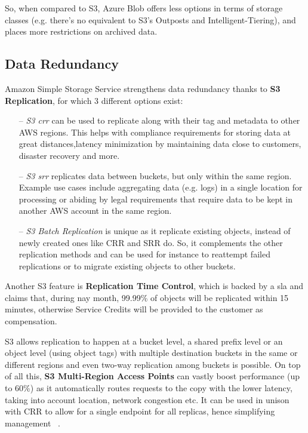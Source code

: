 So, when compared to S3, Azure Blob offers less options in terms of storage classes (e.g. there's no equivalent to S3's Outposts and Intelligent-Tiering), and places more restrictions on archived data.

\subsection{Data Redundancy}
Amazon Simple Storage Service strengthens data redundancy thanks to \textbf{S3 Replication}, for which 3 different options exist: ~\cite{s3replication}
\begin{itemize}
    \item [--] \textit{S3 \ac{crr}} can be used to replicate along with their tag and metadata to other AWS regions. This helps with compliance requirements for storing data at great distances,latency minimization by maintaining data close to customers, disaster recovery and more.

    \item [--] \textit{S3 \ac{srr}} replicates data between buckets, but only within the same region. Example use cases include aggregating data (e.g. logs) in a single location for processing or abiding by legal requirements that require data to be kept in another AWS account in the same region.

    \item [--] \textit{S3 Batch Replication} is unique as it replicate existing objects, instead of newly created ones like CRR and SRR do. So, it complements the other replication methods and can be used for instance to reattempt failed replications or to migrate existing objects to other buckets.
\end{itemize}

Another S3 feature is \textbf{Replication Time Control}, which is backed by a \ac{sla} and claims that, during nay month, 99.99\% of objects will be replicated within 15 minutes, otherwise Service Credits will be provided to the customer as compensation.~\cite{s3replicationsla}

S3 allows replication to happen at a bucket level, a shared prefix level or an object level (using object tags) with multiple destination buckets in the same or different regions and even two-way replication among buckets is possible. On top of all this, \textbf{S3 Multi-Region Access Points} can vastly boost performance (up to 60\%) as it automatically routes requests to the copy with the lower latency, taking into account location,  network congestion etc. It can be used in unison with CRR to allow for a single endpoint for all replicas, hence simplifying management ~\cite{s3replication}.

